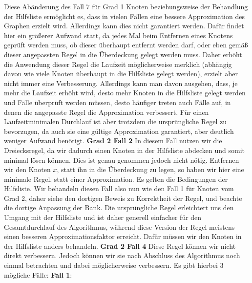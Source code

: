 \documentclass[12pt,onecolumn, notitlepage]{scrartcl}
\begin{document}
Diese Abänderung des Fall 7 für Grad 1 Knoten beziehungsweise der Behandlung der Hilfsliste ermöglicht es, dass in vielen Fällen eine bessere Approximation des Graphen erzielt wird. Allerdings kann dies nicht garantiert werden. Dafür findet hier ein größerer Aufwand statt, da jedes Mal beim Entfernen eines Knotens geprüft werden muss, ob dieser überhaupt entfernt werden darf, oder eben gemäß dieser angepassten Regel in die Überdeckung gelegt werden muss. Daher erhöht die Anwendung dieser Regel die Laufzeit möglicherweise merklich (abhängig davon wie viele Knoten überhaupt in die Hilfsliste gelegt werden), erzielt aber nicht immer eine Verbesserung. Allerdings kann man davon ausgehen, dass, je mehr die Laufzeit erhöht wird, desto mehr Knoten in die Hilfsliste gelegt werden und Fälle überprüft werden müssen, desto häufiger treten auch Fälle auf, in denen die angepasste Regel die Approximation verbessert. Für einen Laufzeitminimalen Durchlauf ist aber trotzdem die ursprüngliche Regel zu bevorzugen, da auch sie eine gültige Approximation garantiert, aber deutlich weniger Aufwand benötigt.\newline \newline
\textbf{Grad 2 Fall 2} \newline
In diesem Fall nutzen wir die Dreiecksregel, da wir dadurch einen Knoten in der Hilfsliste abdecken und somit minimal lösen können. Dies ist genau genommen jedoch nicht nötig. Entfernen wir den Knoten $x$, statt ihn in die Überdeckung zu legen, so haben wir hier eine minimale Regel, statt einer Approximation. Es gelten die Bedingungen der Hilfsliste. Wir behandeln diesen Fall also nun wie den Fall 1 für Knoten vom Grad 2, daher siehe den dortigen Beweis zu Korrektheit der Regel, und beachte die dortige Anpassung der Bank.\newline
Die ursprüngliche Regel erleichtert uns den Umgang mit der Hilfsliste und ist daher generell einfacher für den Gesamtdurchlauf des Algorithmus, während diese Version der Regel meistens einen besseren Approximationsfaktor erreicht. Dafür müssen wir den Knoten in der Hilfsliste anders behandeln.  \newline \newpage
\textbf{Grad 2 Fall 4} \newline
Diese Regel können wir nicht direkt verbessern. Jedoch können wir sie nach Abschluss des Algorithmus noch einmal betrachten und dabei möglicherweise verbessern. Es gibt hierbei 3 mögliche Fälle: \newline \newline
\textbf{Fall 1}:\newline
\end{document}

